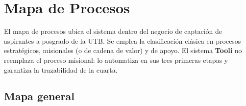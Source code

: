 \documentclass[12pt,a4paper]{report}
\begin{document}
\clearpage
\section{Mapa de Procesos}

El mapa de procesos ubica el sistema dentro del negocio de captación de aspirantes a posgrado de la
UTB. Se emplea la clasificación clásica en procesos estratégicos, misionales (o de cadena de valor)
y de apoyo. El sistema \textbf{Tooli} no reemplaza el proceso misional: lo automatiza en sus tres
primeras etapas y garantiza la trazabilidad de la cuarta.

\subsection{Mapa general}
\end{document}
